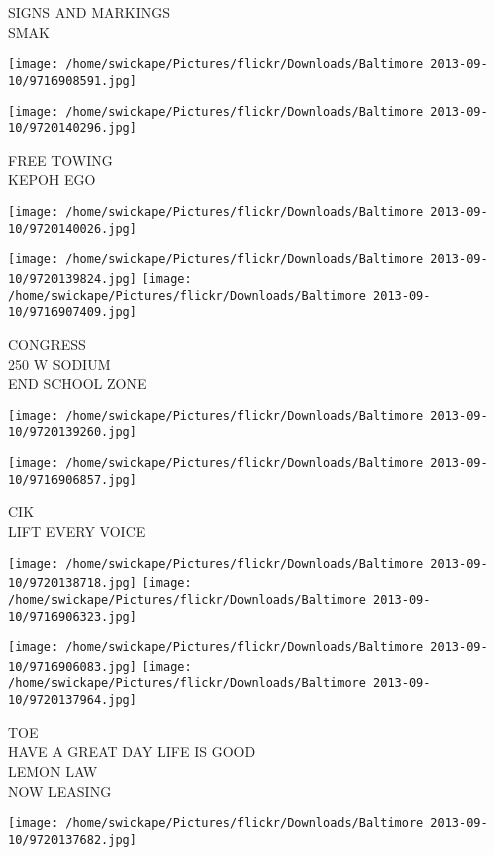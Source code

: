 \documentclass[10pt,letterpaper]{article}
\begin{document}
SIGNS AND MARKINGS\\
SMAK
\pagebreak

\texttt{[image: /home/swickape/Pictures/flickr/Downloads/Baltimore 2013-09-10/9716908591.jpg]}

\vspace{0.25in}
\texttt{[image: /home/swickape/Pictures/flickr/Downloads/Baltimore 2013-09-10/9720140296.jpg]}

FREE TOWING\\
KEPOH EGO
\pagebreak

\texttt{[image: /home/swickape/Pictures/flickr/Downloads/Baltimore 2013-09-10/9720140026.jpg]}

\vspace{0.25in}
\texttt{[image: /home/swickape/Pictures/flickr/Downloads/Baltimore 2013-09-10/9720139824.jpg]}
\texttt{[image: /home/swickape/Pictures/flickr/Downloads/Baltimore 2013-09-10/9716907409.jpg]}

CONGRESS\\
250 W SODIUM\\
END SCHOOL ZONE
\pagebreak

\texttt{[image: /home/swickape/Pictures/flickr/Downloads/Baltimore 2013-09-10/9720139260.jpg]}

\vspace{0.25in}
\texttt{[image: /home/swickape/Pictures/flickr/Downloads/Baltimore 2013-09-10/9716906857.jpg]}

CIK\\
LIFT EVERY VOICE
\pagebreak

\texttt{[image: /home/swickape/Pictures/flickr/Downloads/Baltimore 2013-09-10/9720138718.jpg]}
\texttt{[image: /home/swickape/Pictures/flickr/Downloads/Baltimore 2013-09-10/9716906323.jpg]}

\texttt{[image: /home/swickape/Pictures/flickr/Downloads/Baltimore 2013-09-10/9716906083.jpg]}
\texttt{[image: /home/swickape/Pictures/flickr/Downloads/Baltimore 2013-09-10/9720137964.jpg]}

TOE\\
HAVE A GREAT DAY LIFE IS GOOD\\
LEMON LAW\\
NOW LEASING
\pagebreak

\texttt{[image: /home/swickape/Pictures/flickr/Downloads/Baltimore 2013-09-10/9720137682.jpg]}
\end{document}
